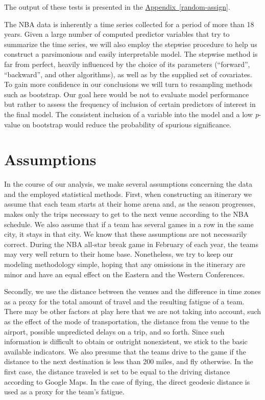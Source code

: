 \documentclass[
    12pt,
    a4paper,
    titlepage,  %
    abstract,  %
    headings=standardclasses,  %
    bibliography=totocnumbered  %
]{scrartcl}
\begin{document}
The output of these tests is presented in the \hyperref[random-assign]{Appendix~\ref*{random-assign}}.

The NBA data is inherently a time series collected for a period of more than 18 years. Given a large number of computed predictor variables that try to summarize the time series, we will also employ the stepwise procedure to help us construct a parsimonious and easily interpretable model.  The stepwise method is far from perfect, heavily influenced by the choice of its parameters (``forward'', ``backward'', and other algorithms), as well as by the supplied set of covariates. To gain more confidence in our conclusions we will turn to resampling methods such as bootstrap. Our goal here would be not to evaluate model performance but rather to assess the frequency of inclusion of certain predictors of interest in the final model. The consistent inclusion of a variable into the model and a low \emph{p}-value on bootstrap would reduce the probability of spurious significance. 

\section{Assumptions}

In the course of our analysis, we make several assumptions concerning the data and the employed statistical methods. First, when constructing an itinerary we assume that each team starts at their home arena and, as the season progresses, makes only the trips necessary to get to the next venue according to the NBA schedule. We also assume that if a team has several games in a row in the same city, it stays in that city. We know that these assumptions are not necessarily correct. During the NBA all-star break game in February of each year, the teams may very well return to their home base. Nonetheless, we try to keep our modeling methodology simple, hoping that any omissions in the itinerary are minor and have an equal effect on the Eastern and the Western Conferences.

Secondly, we use the distance between the venues and the difference in time zones as a proxy for the total amount of travel and the resulting fatigue of a team. There may be other factors at play here that we are not taking into account, such as the effect of the mode of transportation, the distance from the venue to the airport, possible unpredicted delays on a trip, and so forth. Since such information is difficult to obtain or outright nonexistent, we stick to the basic available indicators. We also presume that the teams drive to the game if the distance to the next destination is less than 200 miles, and fly otherwise. In the first case, the distance traveled is set to be equal to the driving distance according to Google Maps. In the case of flying, the direct geodesic distance is used as a proxy for the team's fatigue.
\end{document}
